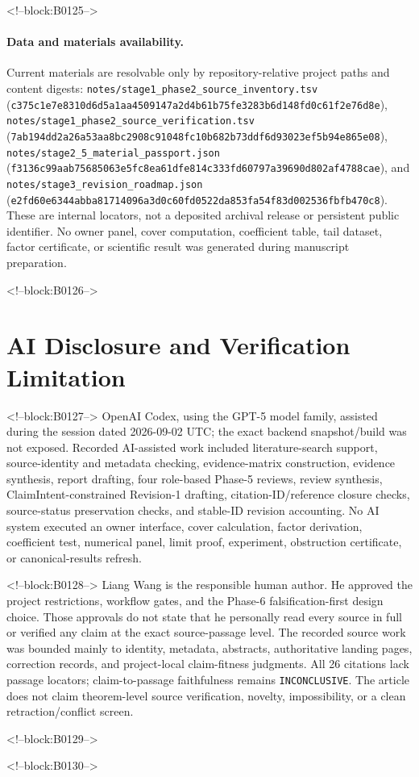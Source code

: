 \documentclass[11pt]{article}
\begin{document}
<!--block:B0125-->
\paragraph{Data and materials availability.} Current materials are
resolvable only by repository-relative project paths and content digests:
\texttt{notes/stage1\_phase2\_source\_inventory.tsv}
(\texttt{c375c1e7e8310d6d5a1aa4509147a2d4b61b75fe3283b6d148fd0c61f2e76d8e}),
\texttt{notes/stage1\_phase2\_source\_verification.tsv}
(\texttt{7ab194dd2a26a53aa8bc2908c91048fc10b682b73ddf6d93023ef5b94e865e08}),
\texttt{notes/stage2\_5\_material\_passport.json}
(\texttt{f3136c99aab75685063e5fc8ea61dfe814c333fd60797a39690d802af4788cae}),
and \texttt{notes/stage3\_revision\_roadmap.json}
(\texttt{e2fd60e6344abba81714096a3d0c60fd0522da853fa54f83d002536fbfb470c8}).
These are internal locators, not a deposited archival release or persistent
public identifier. No owner panel, cover computation, coefficient table, tail
dataset, factor certificate, or scientific result was generated during
manuscript preparation.

<!--block:B0126-->
\hypertarget{ai-disclosure-and-verification-limitation}{%
\section*{AI Disclosure and Verification
Limitation}\label{ai-disclosure-and-verification-limitation}}

<!--block:B0127-->
OpenAI Codex, using the GPT-5 model family, assisted during the session
dated 2026-09-02 UTC; the exact backend snapshot/build was not exposed.
Recorded AI-assisted work included literature-search support,
source-identity and metadata checking, evidence-matrix construction,
evidence synthesis, report drafting, four role-based Phase-5 reviews,
review synthesis, ClaimIntent-constrained Revision-1 drafting,
citation-ID/reference closure checks, source-status preservation checks,
and stable-ID revision accounting. No AI system executed an owner
interface, cover calculation, factor derivation, coefficient test,
numerical panel, limit proof, experiment, obstruction certificate, or
canonical-results refresh.

<!--block:B0128-->
Liang Wang is the responsible human author. He approved the project
restrictions, workflow gates, and the Phase-6 falsification-first design
choice. Those approvals do not state that he personally read every
source in full or verified any claim at the exact source-passage level.
The recorded source work was bounded mainly to identity, metadata,
abstracts, authoritative landing pages, correction records, and
project-local claim-fitness judgments. All 26 citations lack passage
locators; claim-to-passage faithfulness remains \texttt{INCONCLUSIVE}.
The article does not claim theorem-level source verification, novelty,
impossibility, or a clean retraction/conflict screen.

<!--block:B0129-->



<!--block:B0130-->
\end{document}
